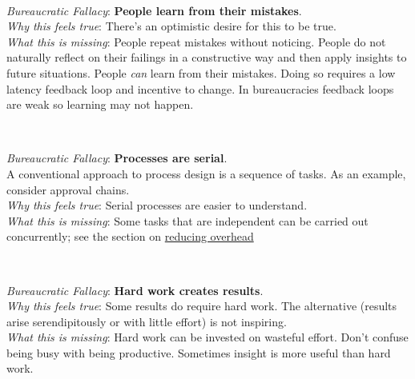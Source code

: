 \ \\
\begin{samepage}
\textit{Bureaucratic Fallacy}: \textbf{People learn from their mistakes}. \\
\textit{Why this feels true}: There's an optimistic desire for this to be true. \\
\textit{What this is missing}: 
People repeat mistakes without noticing. People do not naturally reflect on their failings in a constructive way and then apply insights to future situations.
People \textit{can} learn from their mistakes. Doing so requires a low latency feedback loop and incentive to change. In bureaucracies feedback loops are weak so learning may not happen.
\end{samepage}

\ \\
\begin{samepage}
\textit{Bureaucratic Fallacy}: \textbf{Processes are serial}.\\
A conventional approach to process design is a sequence of tasks. As an example, consider approval chains. \\
\textit{Why this feels true}: Serial processes are easier to understand. \\
\textit{What this is missing}: Some tasks that are independent can be carried out concurrently; see the section on \hyperref[sec:reducing-overhead]{reducing overhead}\iftoggle{haspagenumbers}{on page~\pageref{sec:reducing-overhead}.}{.}
\end{samepage}

\ \\
\begin{samepage}
\textit{Bureaucratic Fallacy}: \textbf{Hard work creates results}.\\
\textit{Why this feels true}: Some results do require hard work. The alternative (results arise serendipitously or with little effort) is not inspiring. \\
\textit{What this is missing}: Hard work can be invested on wasteful effort. Don't confuse being busy with being productive. Sometimes insight is more useful than hard work. 
\end{samepage}





